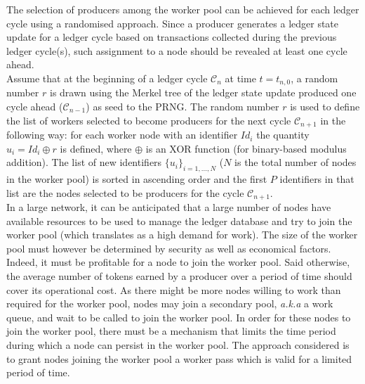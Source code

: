 
The selection of producers among the worker pool can be achieved for each ledger cycle using a randomised approach. Since a producer generates a ledger state update for a ledger cycle based on transactions collected during the previous ledger cycle(s), such assignment to a node should be revealed at least one cycle ahead.\\

Assume that at the beginning of a ledger cycle $\mathcal{C}_n$ at time $t = t_{n,0}$, a random number $r$ is drawn using the Merkel tree of the ledger state update produced one cycle ahead ($\mathcal{C}_{n-1}$) as seed to the PRNG. The random number $r$ is used to define the list of workers selected to become producers for the next cycle $\mathcal{C}_{n+1}$ in the following way: for each worker node with an identifier $Id_i$ the quantity $u_i = Id_i \oplus r$ is defined, where $\oplus$ is an XOR function (for binary-based modulus addition). The list of new identifiers $\{u_i \}_{i=1,...,N}$ ($N$ is the total number of nodes in the worker pool) is sorted in ascending order and the first $P$ identifiers in that list are the nodes selected to be producers for the cycle $\mathcal{C}_{n+1}$.\\


In a large network, it can be anticipated that a large number of nodes have available resources to be used to manage the ledger database and try to join the worker pool (which translates as a high demand for work). The size of the worker pool must however be determined by security as well as economical factors. Indeed, it must be profitable for a node to join the worker pool. Said otherwise, the average number of tokens earned by a producer over a period of time should cover its operational cost. As there might be more nodes willing to work than required for the worker pool, nodes may join a secondary pool, \textit{a.k.a} a work queue, and wait to be called to join the worker pool. In order for these nodes to join the worker pool, there must be a mechanism that limits the time period during which a node can persist in the worker pool. The approach considered is to grant nodes joining the worker pool a worker pass which is valid for a limited period of time. \\

